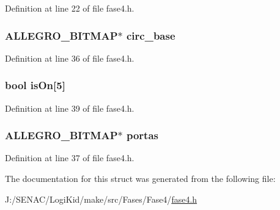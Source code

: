 Definition at line 22 of file fase4.\-h.

\hypertarget{struct_level_quatro_aee8957702842b3d636f0a1075b6e52e2}{
\subsubsection[{circ\-\_\-base}]{\setlength{\rightskip}{0pt plus 5cm}A\-L\-L\-E\-G\-R\-O\-\_\-\-B\-I\-T\-M\-A\-P$\ast$ circ\-\_\-base}}\label{struct_level_quatro_aee8957702842b3d636f0a1075b6e52e2}


Definition at line 36 of file fase4.\-h.

\hypertarget{struct_level_quatro_a59f6fe985ed5513f62660b2926c812aa}{
\subsubsection[{is\-On}]{\setlength{\rightskip}{0pt plus 5cm}bool is\-On\mbox{[}5\mbox{]}}}\label{struct_level_quatro_a59f6fe985ed5513f62660b2926c812aa}


Definition at line 39 of file fase4.\-h.

\hypertarget{struct_level_quatro_a6c47128335a6e9846fb9576bace5a597}{
\subsubsection[{portas}]{\setlength{\rightskip}{0pt plus 5cm}A\-L\-L\-E\-G\-R\-O\-\_\-\-B\-I\-T\-M\-A\-P$\ast$ portas}}\label{struct_level_quatro_a6c47128335a6e9846fb9576bace5a597}


Definition at line 37 of file fase4.\-h.



The documentation for this struct was generated from the following file\-:\begin{DoxyCompactItemize}
\item 
J\-:/\-S\-E\-N\-A\-C/\-Logi\-Kid/make/src/\-Fases/\-Fase4/\hyperlink{fase4_8h}{fase4.\-h}\end{DoxyCompactItemize}

